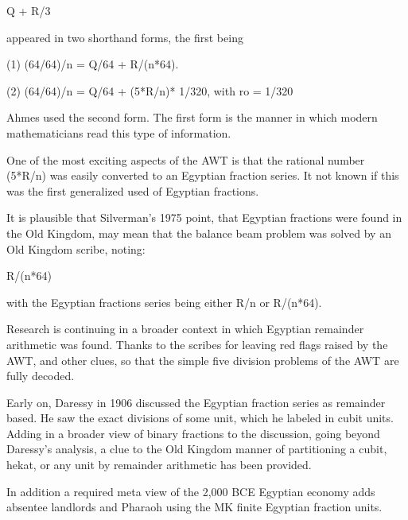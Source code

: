 \documentclass[12pt]{article}
\begin{document}
Q + R/3

appeared in two shorthand forms, the first being

(1) (64/64)/n = Q/64 + R/(n*64).

(2) (64/64)/n = Q/64 + (5*R/n)* 1/320, with ro = 1/320

Ahmes used the second form. The first form is the manner in which modern mathematicians read this type of information.

One of the most exciting aspects of the AWT is that the rational number (5*R/n) was easily converted to an Egyptian fraction series. It not known if this was the
first generalized used of Egyptian fractions.

It is plausible that Silverman's 1975 point, that Egyptian fractions were found in the Old Kingdom, may mean that the balance beam problem was solved by an Old Kingdom scribe, noting:

R/(n*64)

with the Egyptian fractions series being either R/n or R/(n*64).

Research is continuing in a broader context in which Egyptian remainder arithmetic was found. Thanks to the scribes for leaving red flags raised by the AWT, and other clues, so that the simple five division problems of the AWT are fully decoded.

Early on, Daressy in 1906 discussed the Egyptian fraction series as remainder based. He saw the exact divisions of some unit, which he labeled in cubit units. Adding in a broader view of binary fractions to the discussion, going beyond Daressy's analysis, a clue to the Old Kingdom manner of partitioning a cubit, hekat, or any unit by remainder arithmetic has been provided.

In addition a required meta view of the 2,000 BCE Egyptian economy adds absentee landlords and Pharaoh using the MK finite Egyptian fraction units.


\end{document}
